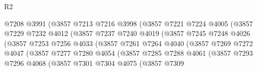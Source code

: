 \begin{lexlean}{R2}
\begin{coremodule}
                                @7208
                                @3991
                                (@3857
                                  @7213
                                  @7216
                                  @3998
                                  (@3857
                                    @7221
                                    @7224
                                    @4005
                                    (@3857
                                      @7229
                                      @7232
                                      @4012
                                      (@3857
                                        @7237
                                        @7240
                                        @4019
                                        (@3857
                                          @7245
                                          @7248
                                          @4026
                                          (@3857
                                            @7253
                                            @7256
                                            @4033
                                            (@3857
                                              @7261
                                              @7264
                                              @4040
                                              (@3857
                                                @7269
                                                @7272
                                                @4047
                                                (@3857
                                                  @7277
                                                  @7280
                                                  @4054
                                                  (@3857
                                                    @7285
                                                    @7288
                                                    @4061
                                                    (@3857
                                                      @7293
                                                      @7296
                                                      @4068
                                                      (@3857
                                                        @7301
                                                        @7304
                                                        @4075
                                                        (@3857
                                                          @7309

\end{coremodule}
\end{lexlean}
